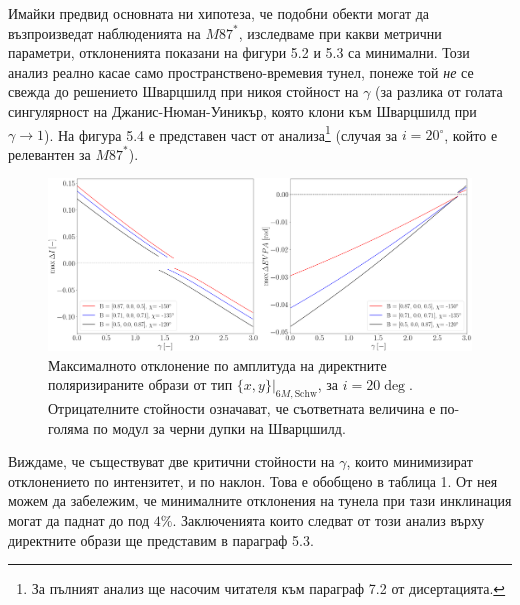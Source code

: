 \documentclass[12pt]{article}
\numberwithin{equation}{section}
\numberwithin{figure}{section}
\begin{document}
	Имайки предвид основната ни хипотеза, че подобни обекти могат да възпроизведат наблюденията на $M87^*$, изследваме при какви метрични параметри, отклоненията показани на фигури 5.2 и 5.3 са минимални. Този анализ реално касае само пространствено-времевия тунел, понеже той \emph{не} се свежда до решението Шварцшилд при никоя стойност на $\gamma$ (за разлика от голата сингулярност на Джанис-Нюман-Уиникър, която клони към Шварцшилд при $\gamma \rightarrow 1$). На фигура 5.4 е представен част от анализа\footnote{За пълният анализ ще насочим читателя към параграф 7.2 от дисертацията.} (случая за $i = 20^\circ$, който е релевантен за $M87^*$).
	
	\begin{figure}[!htb]
		\centering
		\includegraphics[scale = 0.22]{Section_7_Polarized_Emission/WH_20_deg_param_sweep.png}
		\caption[Максималното отклонение на директните поляризираните образи от тип $\{x,y\}\vert_{6M, \text{Schw}}$, за $i = 20\deg$]{\small Максималното отклонение по амплитуда на директните поляризираните образи от тип $\{x,y\}\vert_{6M, \text{Schw}}$, за $i = 20\deg$. Отрицателните стойности означават, че съответната величина е по-голяма по модул за черни дупки на Шварцшилд.} 
		\label{WH_max_deviation_70_deg}
	\end{figure}
	
	Виждаме, че съществуват две критични стойности на $\gamma$, които минимизират отклонението по интензитет, и по наклон. Това е обобщено в таблица 1. От нея можем да забележим, че минималните отклонения на тунела при тази инклинация могат да паднат до под $4\%$. Заключенията които следват от този анализ върху директните образи ще представим в параграф 5.3.
	
\end{document}
